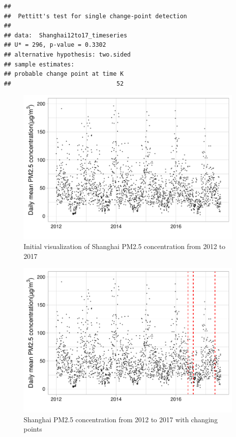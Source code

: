 \documentclass[12pt,]{article}
\begin{document}
\begin{verbatim}
## 
##  Pettitt's test for single change-point detection
## 
## data:  Shanghai12to17_timeseries
## U* = 296, p-value = 0.3302
## alternative hypothesis: two.sided
## sample estimates:
## probable change point at time K 
##                              52
\end{verbatim}

\begin{figure}
\centering
\includegraphics{Project_Template_files/figure-latex/unnamed-chunk-2-1.pdf}
\caption{Initial visualization of Shanghai PM2.5 concentration from 2012
to 2017}
\end{figure}

\begin{figure}
\centering
\includegraphics{Project_Template_files/figure-latex/unnamed-chunk-3-1.pdf}
\caption{Shanghai PM2.5 concentration from 2012 to 2017 with changing
points}
\end{figure}
\end{document}
